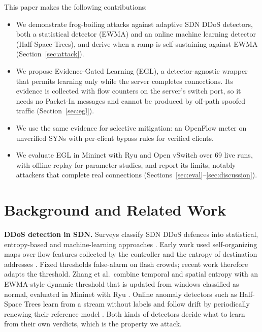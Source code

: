 \documentclass[conference]{IEEEtran}
\begin{document}
This paper makes the following contributions:
\begin{itemize}
\item We demonstrate frog-boiling attacks against adaptive SDN DDoS detectors, both a statistical detector (EWMA) and an online machine learning detector (Half-Space Trees), and derive when a ramp is self-sustaining against EWMA (Section~\ref{sec:attack}).
\item We propose Evidence-Gated Learning (EGL), a detector-agnostic wrapper that permits learning only while the server completes connections. Its evidence is collected with flow counters on the server's switch port, so it needs no Packet-In messages and cannot be produced by off-path spoofed traffic (Section~\ref{sec:egl}).
\item We use the same evidence for selective mitigation: an OpenFlow meter on unverified SYNs with per-client bypass rules for verified clients.
\item We evaluate EGL in Mininet with Ryu and Open vSwitch over 69 live runs, with offline replay for parameter studies, and report its limits, notably attackers that complete real connections (Sections~\ref{sec:eval}--\ref{sec:discussion}).
\end{itemize}

\section{Background and Related Work}\label{sec:related}
\textbf{DDoS detection in SDN.} Surveys classify SDN DDoS defences into statistical, entropy-based and machine-learning approaches \cite{yan2016sdnddos}. Early work used self-organizing maps over flow features collected by the controller \cite{braga2010som} and the entropy of destination addresses \cite{mousavi2015entropy}. Fixed thresholds false-alarm on flash crowds; recent work therefore adapts the threshold. Zhang et al.\ combine temporal and spatial entropy with an EWMA-style dynamic threshold that is updated from windows classified as normal, evaluated in Mininet with Ryu \cite{zhang2026time}. Online anomaly detectors such as Half-Space Trees learn from a stream without labels and follow drift by periodically renewing their reference model \cite{tan2011hst}. Both kinds of detectors decide what to learn from their own verdicts, which is the property we attack.
\end{document}
